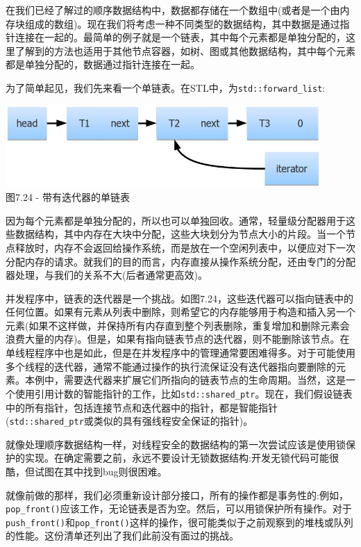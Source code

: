 
在我们已经了解过的顺序数据结构中，数据都存储在一个数组中(或者是一个由内存块组成的数组)。现在我们将考虑一种不同类型的数据结构，其中数据是通过指针连接在一起的。最简单的例子就是一个链表，其中每个元素都是单独分配的，这里了解到的方法也适用于其他节点容器，如树、图或其他数据结构，其中每个元素都是单独分配的，数据通过指针连接在一起。

为了简单起见，我们先来看一个单链表。在STL中，为\texttt{std::forward\_list}:

\begin{center}
\includegraphics[width=0.9\textwidth]{content/2/chapter7/images/24.jpg}\\
图7.24 - 带有迭代器的单链表
\end{center}

因为每个元素都是单独分配的，所以也可以单独回收。通常，轻量级分配器用于这些数据结构，其中内存在大块中分配，这些大块划分为节点大小的片段。当一个节点释放时，内存不会返回给操作系统，而是放在一个空闲列表中，以便应对下一次分配内存的请求。就我们的目的而言，内存直接从操作系统分配，还由专门的分配器处理，与我们的关系不大(后者通常更高效)。

并发程序中，链表的迭代器是一个挑战。如图7.24，这些迭代器可以指向链表中的任何位置。如果有元素从列表中删除，则希望它的内存能够用于构造和插入另一个元素(如果不这样做，并保持所有内存直到整个列表删除，重复增加和删除元素会浪费大量的内存)。但是，如果有指向链表节点的迭代器，则不能删除该节点。在单线程程序中也是如此，但是在并发程序中的管理通常要困难得多。对于可能使用多个线程的迭代器，通常不能通过操作的执行流保证没有迭代器指向要删除的元素。本例中，需要迭代器来扩展它们所指向的链表节点的生命周期。当然，这是一个使用引用计数的智能指针的工作，比如\texttt{std::shared\_ptr}。现在，我们假设链表中的所有指针，包括连接节点和迭代器中的指针，都是智能指针(\texttt{std::shared\_ptr}或类似的具有强线程安全保证的指针)。

就像处理顺序数据结构一样，对线程安全的数据结构的第一次尝试应该是使用锁保护的实现。在确定需要之前，永远不要设计无锁数据结构:开发无锁代码可能很酷，但试图在其中找到bug则很困难。

就像前做的那样，我们必须重新设计部分接口，所有的操作都是事务性的:例如，\texttt{pop\_front()}应该工作，无论链表是否为空。然后，可以用锁保护所有操作。对于\texttt{push\_front()}和\texttt{pop\_front()}这样的操作，很可能类似于之前观察到的堆栈或队列的性能。这份清单还列出了我们此前没有面过的挑战。

